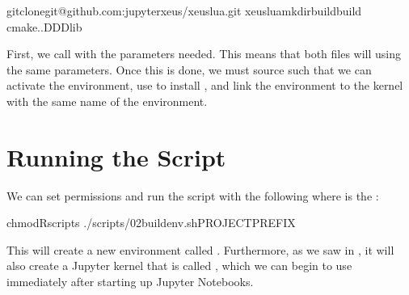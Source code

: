\documentclass[letterpaper,12pt,english]{sphinxmanual}
\begin{document}
\begin{sphinxVerbatim}[commandchars=\\\{\}]
gitclonegit@github.com:jupyter\PYGZhy{}xeus/xeus\PYGZhy{}lua.git
xeus\PYGZhy{}luamkdirbuildbuild
cmake..\PYGZhy{}D\PYGZhy{}D\PYGZhy{}Dlib
\end{sphinxVerbatim}

\sphinxAtStartPar
First, we call  with the parameters needed. This means that both files will using the same parameters. Once this is done, we must source  such that we can activate the environment, use  to install , and link the environment to the kernel with the same name of the environment.


\section{Running the Script}
\label{\detokenize{notebooks/01-automating-setup:running-the-script}}
\sphinxAtStartPar
We can set permissions and run the script with the following where  is the :

\begin{sphinxVerbatim}[commandchars=\\\{\}]
chmod\PYGZhy{}Rscripts
./scripts/02\PYGZhy{}build\PYGZhy{}env.sh\PYGZlt{}PROJECT\PYGZus{}PREFIX\PYGZgt{}
\end{sphinxVerbatim}

\sphinxAtStartPar
This will create a new  environment called . Furthermore, as we saw in , it will also create a Jupyter kernel that is called , which we can begin to use immediately after starting up Jupyter Notebooks.
\end{document}
